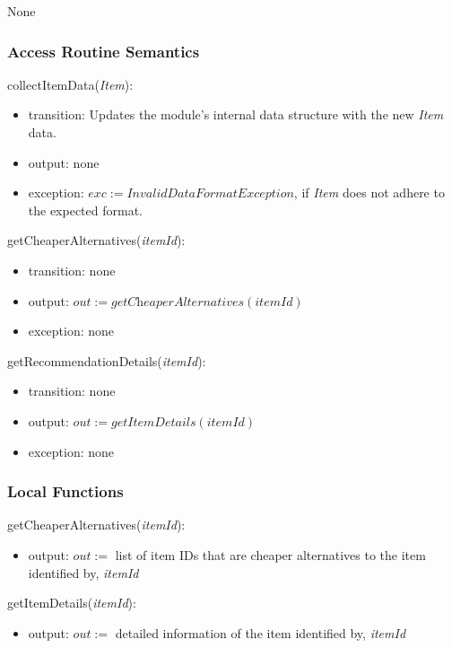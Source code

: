 \documentclass[12pt, titlepage]{article}
\begin{document}
None

\subsubsection{Access Routine Semantics}

\noindent collectItemData(\textit{Item}):
\begin{itemize}
  \item transition: Updates the module's internal data structure with the new \textit{Item} data.
  \item output: none
  \item exception: $exc := \textit{InvalidDataFormatException}$, if \textit{Item} does not adhere to the expected format.
\end{itemize}

\noindent getCheaperAlternatives(\textit{itemId}):
\begin{itemize}
  \item transition: none
  \item output: $out := \textit{getCheaperAlternatives}(\textit{itemId})$ 
  \item exception: none
\end{itemize}

\noindent getRecommendationDetails(\textit{itemId}):
\begin{itemize}
  \item transition: none
  \item output: $out := \textit{getItemDetails}(\textit{itemId})$
  \item exception: none
\end{itemize}

\subsubsection{Local Functions}

\noindent getCheaperAlternatives(\textit{itemId}):
\begin{itemize}
  \item output: $out :=$ list of item IDs that are cheaper alternatives to the item identified by, \textit{itemId}
\end{itemize}

\noindent getItemDetails(\textit{itemId}):
\begin{itemize}
  \item output: $out :=$ detailed information of the item identified by, \textit{itemId}
\end{itemize}
\end{document}
